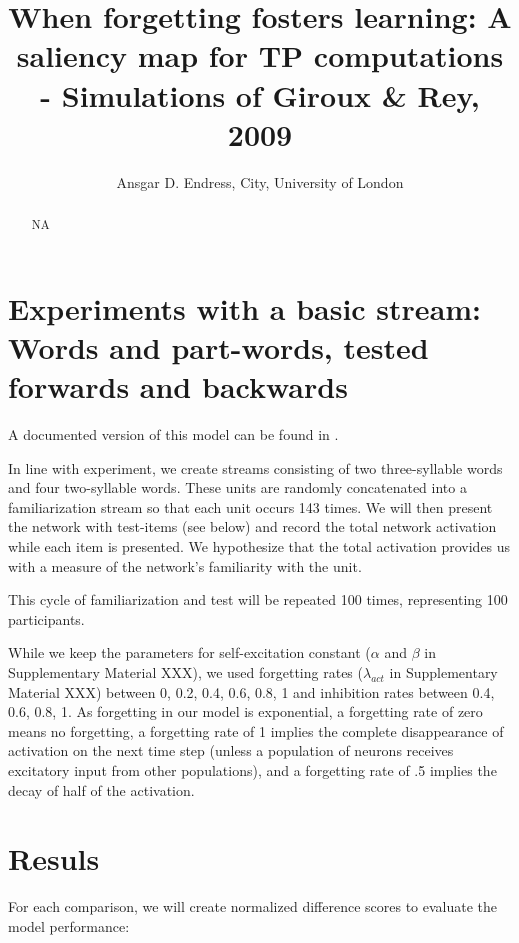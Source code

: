 \documentclass[
]{article}
\title{When forgetting fosters learning: A saliency map for TP
computations - Simulations of Giroux \& Rey, 2009}
\author{Ansgar D. Endress, City, University of London}
\date{}
\begin{document}
\maketitle
\begin{abstract}
NA
\end{abstract}

\hypertarget{experiments-with-a-basic-stream-words-and-part-words-tested-forwards-and-backwards}{%
\section{Experiments with a basic stream: Words and part-words, tested
forwards and
backwards}\label{experiments-with-a-basic-stream-words-and-part-words-tested-forwards-and-backwards}}

A documented version of this model can be found in
\citep{Endress-TP-Model}.

In line with \citep{Giroux2009} experiment, we create streams consisting
of two three-syllable words and four two-syllable words. These units are
randomly concatenated into a familiarization stream so that each unit
occurs 143 times. We will then present the network with test-items (see
below) and record the total network activation while each item is
presented. We hypothesize that the total activation provides us with a
measure of the network's familiarity with the unit.

This cycle of familiarization and test will be repeated 100 times,
representing 100 participants.

While we keep the parameters for self-excitation constant (\(\alpha\)
and \(\beta\) in Supplementary Material XXX), we used forgetting rates
(\(\lambda_{act}\) in Supplementary Material XXX) between 0, 0.2, 0.4,
0.6, 0.8, 1 and inhibition rates between 0.4, 0.6, 0.8, 1. As forgetting
in our model is exponential, a forgetting rate of zero means no
forgetting, a forgetting rate of 1 implies the complete disappearance of
activation on the next time step (unless a population of neurons
receives excitatory input from other populations), and a forgetting rate
of .5 implies the decay of half of the activation.

\hypertarget{resuls}{%
\section{Resuls}\label{resuls}}

For each comparison, we will create normalized difference scores to
evaluate the model performance:
\end{document}
